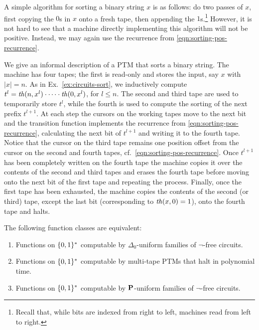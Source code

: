 \documentclass{lmcs}
\begin{document}
\begin{example}
        \label{ex:machines-sort}
	A simple algorithm for sorting a binary string $x$ is as follows: do two passes of $x$, first copying the $0$s in $x$ onto a fresh tape, then appending the $1$s.\footnote{Recall that, while bits are indexed from right to left, machines read from left to right.} However, it is not hard to see that a machine directly implementing this algorithm will not be positive. Instead, we may again use the recurrence from \eqref{eqn:sorting-pos-recurrence}.
	
	We give an informal description of a PTM that sorts a binary string.
	The machine has four tapes; the first is read-only and stores the input, say $x$ with $|x|=n$. As in Ex.~\ref{ex:circuits-sort}, we inductively compute $t^l = \mathit{th}(n,x^l)\cdot \cdots \cdot \mathit{th}(0,x^l)$, for $l\leq n$. 
	The second and third tape are used to temporarily store  $t^l$, while the fourth is used to compute the sorting of the next prefix $t^{l+1}$.
	At each step the cursors on the working tapes move to the next bit and the transition function implements the recurrence from \eqref{eqn:sorting-pos-recurrence}, calculating the next bit of $t^{l+1}$ and writing it to the fourth tape. Notice that the cursor on the third tape remains one position offset from the cursor on the second and fourth tapes, cf.~\eqref{eqn:sorting-pos-recurrence}. 
	Once $t^{l+1}$ has been completely written on the fourth tape the machine copies it over the contents of the second and third tapes and erases the fourth tape before moving onto the next bit of the first tape and repeating the process.
	Finally, once the first tape has been exhausted, the machine copies the contents of the second (or third) tape, except the last bit (corresponding to $\mathit{th}(x,0)=1$), onto the fourth tape and halts.
\end{example}



\begin{theorem}
	\label{thm:equiv-posfp}
	The following function classes are equivalent:
	\begin{enumerate}[(1)]
		\item\label{item:qf-uniform-posfp} Functions on $\{0,1\}^*$ computable by $\Delta_0$-uniform families of $\neg$-free circuits.
				\item\label{item:postm-posfp} Functions on $\{0,1\}^*$ computable by multi-tape PTMs that halt in polynomial time.
		\item\label{item:p-uniform-posfp} Functions on $\{0,1\}^*$ computable by $\mathbf{P}$-uniform families of $\neg$-free circuits.
	\end{enumerate}
\end{theorem}
\end{document}
